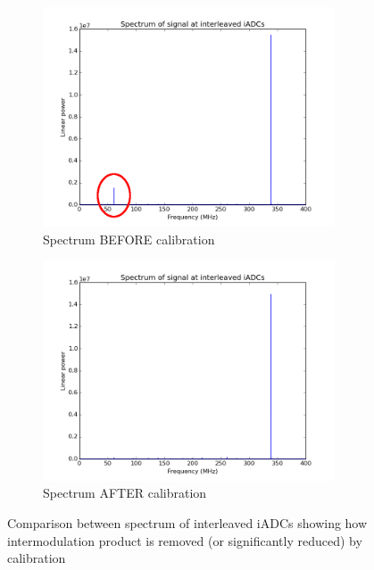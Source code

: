 \begin{figure}
  \centering
  \begin{subfigure}[b]{0.8\textwidth}
    \centering
    \includegraphics[clip=true, width=0.95\textwidth]{interleaved-spectrum-uncal-circled}
    \caption{Spectrum BEFORE calibration}
  \end{subfigure}
  \begin{subfigure}[b]{0.8\textwidth}
    \centering
    \includegraphics[clip=true, width=0.95\textwidth]{interleaved-spectrum-cal}
    \caption{Spectrum AFTER calibration}
  \end{subfigure}
  \caption{Comparison between spectrum of interleaved iADCs showing how intermodulation product is removed (or significantly reduced) by calibration}
\end{figure}
